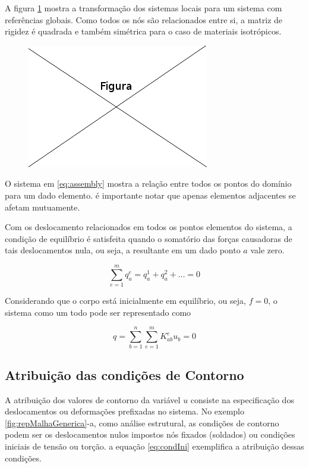 \documentclass[
    12pt,               %
    openright,          %
    oneside,
    a4paper,            %
    english,            %
    french,             %
    spanish,            %
    brazil              %
    ]{abntex2}
\begin{document}
  A figura \ref{fig:loc2glob} mostra a transformação dos sistemas locais para um sistema com referências globais. Como todos os nós são relacionados entre si, a matriz de rigidez é quadrada e também simétrica para o caso de materiais isotrópicos.
  
  \begin{figure}[!htb]
  \centering
  \includegraphics[scale=0.5]{figuras/temp.png}
  \caption{}
  \label{fig:loc2glob}
  \end{figure}
  
  O sistema em \ref{eq:assembly} mostra a relação entre todos os pontos do domínio para um dado elemento. é importante notar que apenas elementos adjacentes se afetam mutuamente.
  

 
 Com os deslocamento relacionados em todos os pontos elementos do sistema,
 a condição de equilíbrio é satisfeita quando o somatório das forças causadoras de tais deslocamentos nula, ou seja, a resultante em um dado ponto $a$ vale zero.
 
  \begin{equation}
    \label{eq:somaForcas}
    \sum_{e=1}^{m}{q_a^e = q_a^1 + q_a^2 + \dots = 0}
  \end{equation}
  
  Considerando que o corpo está inicialmente em equilíbrio, ou seja, $f = 0$, o sistema como um todo pode ser representado como 
  
    \begin{equation}
        \label{eq:equilibrio}
        q =
        \sum_{b=1}^{n}\sum_{e=1}^{m}{K_{ab}^e u_b = 0}
    \end{equation}
    
    
\subsection{Atribuição das condições de Contorno}
A atribuição dos valores de contorno da variável $u$ consiste na especificação dos deslocamentos ou deformações prefixadas no sistema. No exemplo \ref{fig:repMalhaGenerica}-a, como análise estrutural, as condições de contorno podem ser os deslocamentos nulos impostos nós fixados (soldados) ou condições iniciais de tensão ou torção. a equação \ref{eq:condIni} exemplifica a atribuição dessas condições.
\end{document}
